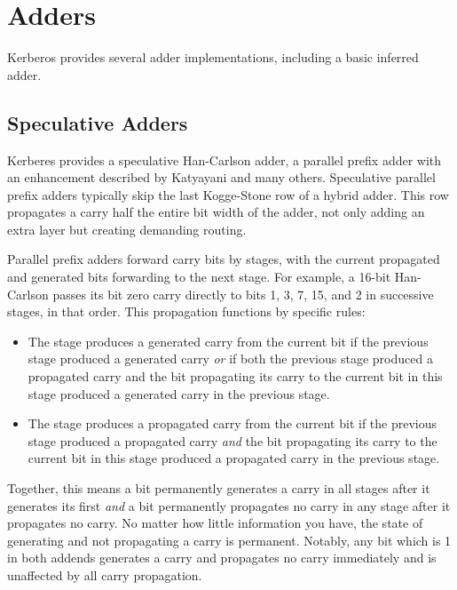 \chapter{Adders}

Kerberos provides several adder implementations, including a basic inferred adder.

\section{Speculative Adders}

Kerberes provides a speculative Han-Carlson adder, a parallel prefix adder with an enhancement described by Katyayani and many others.  Speculative parallel prefix adders typically skip the last Kogge-Stone row of a hybrid adder.  This row propagates a carry half the entire bit width of the adder, not only adding an extra layer but creating demanding routing.

Parallel prefix adders forward carry bits by stages, with the current propagated and generated bits forwarding to the next stage.  For example, a 16-bit Han-Carlson passes its bit zero carry directly to bits 1, 3, 7, 15, and 2 in successive stages, in that order.  This propagation functions by specific rules:

\begin{itemize}
    \item The stage produces a generated carry from the current bit if the previous stage produced a generated carry \textit{or} if both the previous stage produced a propagated carry and the bit propagating its carry to the current bit in this stage produced a generated carry in the previous stage.
    \item The stage produces a propagated carry from the current bit if the previous stage produced a propagated carry \textit{and} the bit propagating its carry to the current bit in this stage produced a propagated carry in the previous stage.
\end{itemize}

Together, this means a bit permanently generates a carry in all stages after it generates its first \textit{and} a bit permanently propagates no carry in any stage after it propagates no carry.  No matter how little information you have, the state of generating and not propagating a carry is permanent.  Notably, any bit which is 1 in both addends generates a carry and propagates no carry immediately and is unaffected by all carry propagation.

